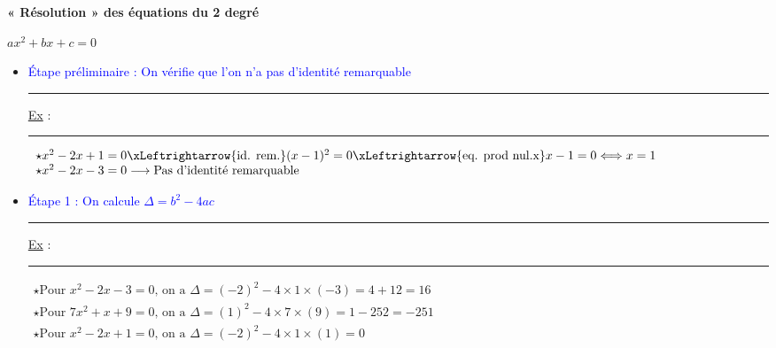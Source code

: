 \ifdefined\COMPLETE
\else
    
    
\usepackage{enumitem}   

    
\fi

\centerline{\color{red} \huge \bf « Résolution » des équations du 2 degré} 

\medskip 

\centerline{\color{red} \huge \bf $ax^2 + bx +c = 0$} 

\bigskip 

\begin{itemize}[label=]

\item  \textcolor{blue}{Étape préliminaire : On vérifie que l'on n'a pas d'identité remarquable} 


\parbox[t]{1cm}{\hrule height 0pt width 0pt%
\underline {Ex} :} 
%
\parbox[t]{10cm}{\hrule height 0pt width 0pt%
$\begin{array}{l}
\star  x^2 -2 x + 1 = 0 
        \xLeftrightarrow{\text{id. rem.}} (x-1)^2 = 0
        \xLeftrightarrow{\text{eq. prod nul.x}} x-1 = 0 
        \Longleftrightarrow x=1 \\
\star        x^2 -2x -3 = 0 \longrightarrow \text{Pas d'identité remarquable} \\                                  
\end{array} $ } 

\bigskip 

\item  \textcolor{blue}{Étape 1 : On calcule $\Delta = b^2 -4ac$}

\parbox[t]{1cm}{\hrule height 0pt width 0pt \underline {Ex} :} 
%
\parbox[t]{10cm}{\hrule height 0pt width 0pt $\begin{array}{l}
\star \text{Pour } x^2 -2x -3 = 0 \text{, on a } \Delta = (-2)^2 -4 \times 1 \times (-3) = 4 + 12 = 16\\
\star \text{Pour } 7x^2 +x +9 = 0\text{, on a } \Delta = (1)^2 -4 \times 7 \times (9) = 1-252 = -251\\
\star \text{Pour } x^2 -2x +1 = 0 \text{, on a } \Delta = (-2)^2 -4 \times 1 \times (1) = 0\\       
\end{array} $}



\end{itemize}
